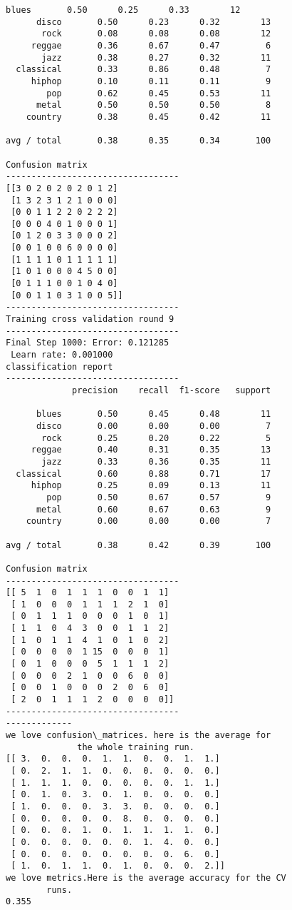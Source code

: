 \documentclass{article}
\begin{document}
\begin{Verbatim}[commandchars=\\\{\}]
      blues       0.50      0.25      0.33        12
      disco       0.50      0.23      0.32        13
       rock       0.08      0.08      0.08        12
     reggae       0.36      0.67      0.47         6
       jazz       0.38      0.27      0.32        11
  classical       0.33      0.86      0.48         7
     hiphop       0.10      0.11      0.11         9
        pop       0.62      0.45      0.53        11
      metal       0.50      0.50      0.50         8
    country       0.38      0.45      0.42        11

avg / total       0.38      0.35      0.34       100

Confusion matrix
----------------------------------
[[3 0 2 0 2 0 2 0 1 2]
 [1 3 2 3 1 2 1 0 0 0]
 [0 0 1 1 2 2 0 2 2 2]
 [0 0 0 4 0 1 0 0 0 1]
 [0 1 2 0 3 3 0 0 0 2]
 [0 0 1 0 0 6 0 0 0 0]
 [1 1 1 1 0 1 1 1 1 1]
 [1 0 1 0 0 0 4 5 0 0]
 [0 1 1 1 0 0 1 0 4 0]
 [0 0 1 1 0 3 1 0 0 5]]
----------------------------------
Training cross validation round 9
----------------------------------
Final Step 1000: Error: 0.121285 
 Learn rate: 0.001000
classification report 
----------------------------------
             precision    recall  f1-score   support

      blues       0.50      0.45      0.48        11
      disco       0.00      0.00      0.00         7
       rock       0.25      0.20      0.22         5
     reggae       0.40      0.31      0.35        13
       jazz       0.33      0.36      0.35        11
  classical       0.60      0.88      0.71        17
     hiphop       0.25      0.09      0.13        11
        pop       0.50      0.67      0.57         9
      metal       0.60      0.67      0.63         9
    country       0.00      0.00      0.00         7

avg / total       0.38      0.42      0.39       100

Confusion matrix
----------------------------------
[[ 5  1  0  1  1  1  0  0  1  1]
 [ 1  0  0  0  1  1  1  2  1  0]
 [ 0  1  1  1  0  0  0  1  0  1]
 [ 1  1  0  4  3  0  0  1  1  2]
 [ 1  0  1  1  4  1  0  1  0  2]
 [ 0  0  0  0  1 15  0  0  0  1]
 [ 0  1  0  0  0  5  1  1  1  2]
 [ 0  0  0  2  1  0  0  6  0  0]
 [ 0  0  1  0  0  0  2  0  6  0]
 [ 2  0  1  1  1  2  0  0  0  0]]
----------------------------------
-------------
we love confusion\_matrices. here is the average for
              the whole training run.
[[ 3.  0.  0.  0.  1.  1.  0.  0.  1.  1.]
 [ 0.  2.  1.  1.  0.  0.  0.  0.  0.  0.]
 [ 1.  1.  1.  0.  0.  0.  0.  0.  1.  1.]
 [ 0.  1.  0.  3.  0.  1.  0.  0.  0.  0.]
 [ 1.  0.  0.  0.  3.  3.  0.  0.  0.  0.]
 [ 0.  0.  0.  0.  0.  8.  0.  0.  0.  0.]
 [ 0.  0.  0.  1.  0.  1.  1.  1.  1.  0.]
 [ 0.  0.  0.  0.  0.  0.  1.  4.  0.  0.]
 [ 0.  0.  0.  0.  0.  0.  0.  0.  6.  0.]
 [ 1.  0.  1.  1.  0.  1.  0.  0.  0.  2.]]
we love metrics.Here is the average accuracy for the CV
        runs.
0.355
    \end{Verbatim}
\end{document}
